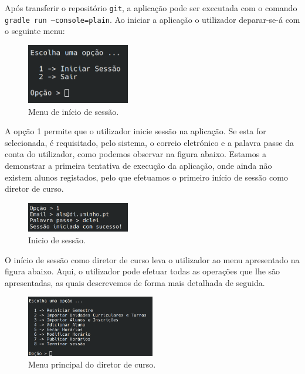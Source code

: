 \documentclass[12pt, a4paper]{article}
\begin{document}
Após transferir o repositório \texttt{git}, a aplicação pode ser executada com o comando
\texttt{gradle run --console=plain}. Ao iniciar a aplicação o utilizador deparar-se-á com o seguinte
menu:

\begin{figure}[H]
    \centering
    \includegraphics[width=0.4\textwidth]{Imagens/Manual/IniciarSessao.png}
    \caption{Menu de início de sessão.}
    \label{iniciarsessao}
\end{figure}

A opção 1 permite que o utilizador inicie sessão na aplicação. Se esta for selecionada, é
requisitado, pelo sistema, o correio eletrónico e a palavra passe da conta do utilizador, como
podemos observar na figura abaixo. Estamos a demonstrar a primeira tentativa de execução da
aplicação, onde ainda não existem alunos registados, pelo que efetuamos o primeiro início de sessão
como diretor de curso.

\begin{figure}[H]
    \centering
    \includegraphics[width=0.4\textwidth]{Imagens/Manual/IniciarSessao-1.png}
    \caption{Inicio de sessão.}
\end{figure}

O início de sessão como diretor de curso leva o utilizador ao menu apresentado na figura abaixo.
Aqui, o utilizador pode efetuar todas as operações que lhe são apresentadas, as quais descrevemos de
forma mais detalhada de seguida.

\begin{figure}[H]
    \centering
    \includegraphics[width=0.5\textwidth]{Imagens/Manual/DiretorCurso.png}
    \caption{Menu principal do diretor de curso.}
    \label{menudiretor}
\end{figure}
\end{document}
